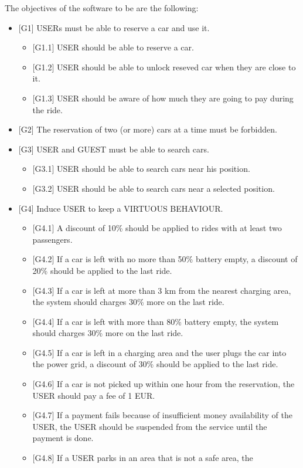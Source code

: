The objectives of the software to be are the following:
\begin{itemize}
\item {[}G1{]} USERs must be able to reserve a car and use it.
\begin{itemize}
\item {[}G1.1{]} USER should be able to reserve a car\@.
\item {[}G1.2{]} USER should be able to unlock reseved car when they are
close to it.
\item {[}G1.3{]} USER should be aware of how much they are going to pay
during the ride.
\end{itemize}
\item {[}G2{]} The reservation of two (or more) cars at a time must be forbidden.
\item {[}G3{]} USER and GUEST must be able to search cars.
\begin{itemize}
\item {[}G3.1{]} USER should be able to search cars near his position.
\item {[}G3.2{]} USER should be able to search cars near a selected position.
\end{itemize}
\item {[}G4{]} Induce USER to keep a VIRTUOUS BEHAVIOUR.
\begin{itemize}
\item {[}G4.1{]} A discount of 10\% should be applied to rides with at least
two passengers. 
\item {[}G4.2{]} If a car is left with no more than 50\% battery empty,
a discount of 20\% should be applied to the last ride.
\item {[}G4.3{]} If a car is left at more than 3 km from the nearest charging
area, the system should charges 30\% more on the last ride.
\item {[}G4.4{]} If a car is left with more than 80\% battery empty, the
system should charges 30\% more on the last ride. 
\item {[}G4.5{]} If a car is left in a charging area and the user plugs
the car into the power grid, a discount of 30\% should be applied
to the last ride.
\item {[}G4.6{]} If a car is not picked up within one hour from the reservation,
the USER should pay a fee of 1 EUR.
\item {[}G4.7{]} If a payment fails because of insufficient money availability
of the USER, the USER should be suspended from the service until the
payment is done.
\item {[}G4.8{]} If a USER parks in an area that is not a safe area, the

\end{itemize}
\end{itemize}
